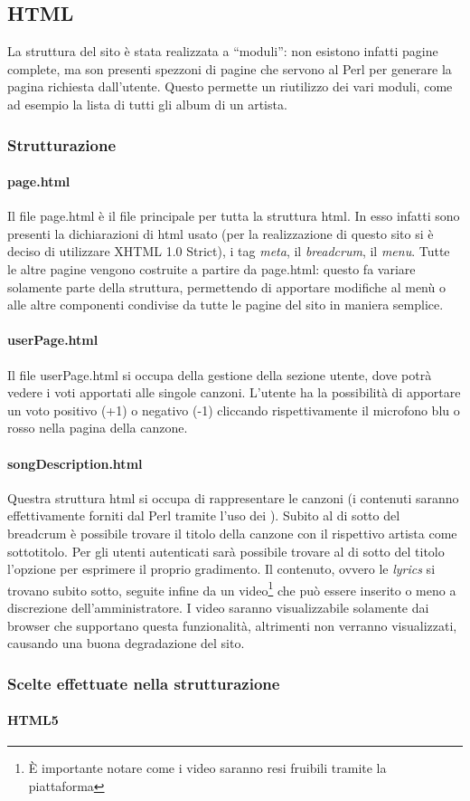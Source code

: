 \subsection{HTML}
La struttura del sito \`e stata realizzata a ``moduli'': non esistono infatti pagine complete, ma son presenti spezzoni di pagine che servono al Perl per generare la pagina richiesta dall'utente. Questo permette un riutilizzo dei vari moduli, come ad esempio la lista di tutti gli album di un artista.
\subsubsection{Strutturazione}
\paragraph*{page.html} Il file page.html \`e il file principale per tutta la struttura html. In esso infatti sono presenti la dichiarazioni di html usato (per la realizzazione di questo sito si \`e deciso di utilizzare XHTML 1.0 Strict), i tag \textit{meta}, il \textit{breadcrum}, il \textit{menu}. Tutte le altre pagine vengono costruite a partire da page.html: questo fa variare solamente parte della struttura, permettendo di apportare modifiche al men\`u o alle altre componenti condivise da tutte le pagine del sito in maniera semplice.

\paragraph{userPage.html} Il file userPage.html si occupa della gestione della sezione utente, dove potrà vedere i voti apportati alle singole canzoni. L'utente ha la possibilità di apportare un voto positivo (+1) o negativo (-1) cliccando rispettivamente il microfono blu o rosso nella pagina della canzone.

\paragraph{songDescription.html} Questra struttura html si occupa di rappresentare le canzoni (i contenuti saranno effettivamente forniti dal Perl tramite l'uso dei ). Subito al di sotto del breadcrum è possibile trovare il titolo della canzone con il rispettivo artista come sottotitolo. Per gli utenti autenticati sarà possibile trovare al di sotto del titolo l'opzione per esprimere il proprio gradimento. Il contenuto, ovvero le \textit{lyrics} si trovano subito sotto, seguite infine da un video\footnote{È importante notare come i video saranno resi fruibili tramite la piattaforma } che può essere inserito o meno a discrezione dell'amministratore. I video saranno visualizzabile solamente dai browser che supportano questa funzionalità, altrimenti non verranno visualizzati, causando una buona degradazione del sito.
\subsubsection{Scelte effettuate nella strutturazione}
\paragraph{HTML5}
